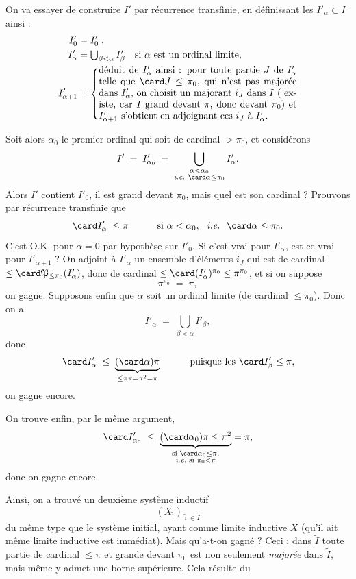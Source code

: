 %

On va essayer de construire $I'$ par récurrence transfinie, en définissant les $I'_\alpha\subset I$ ainsi :
\[
\begin{aligned}
I'_0 &= I'_0\;, \\
I'_\alpha &= \textstyle\bigcup_{\beta<\alpha} I'_\beta \quad \text{si $\alpha$ est un ordinal limite,} \\
I'_{\alpha+1} &= \left\{\parbox{0.6\textwidth}{déduit de $I'_\alpha$ ainsi : pour toute partie $J$ de $I'_\alpha$ telle que $\card J\le\pi_0$, qui n'est pas majorée dans $I'_\alpha$, on choisit un majorant $i_J$ dans $I$ ( existe, car $I$ grand devant $\pi$, donc devant $\pi_0$) et $I'_{\alpha+1}$ s'obtient en adjoignant ces $i_J$ à $I'_\alpha$.}\right.
\end{aligned}
\]

Soit alors $\alpha_0$ le premier ordinal qui soit de cardinal $>\pi_0$, et considérons
\[
I' \;=\; I'_{\alpha_0} \;=\; \bigcup\limits_{\substack{\alpha<\alpha_0\\ \textit{i.e.}\ \card\alpha\le\pi_0}} I'_\alpha .
\]
Alors $I'$ contient $I'_0$, il est grand devant $\pi_0$, mais quel est son cardinal ? Prouvons par récurrence transfinie que
\[
\card I'_\alpha \;\le\pi \qquad\quad \text{si } \alpha<\alpha_0,\ \ \textit{i.e.}\ \ \card\alpha\le\pi_0 .
\]
C'est O.K. pour $\alpha=0$ par hypothèse sur $I'_0$. Si c'est vrai pour $I'_\alpha$, est-ce vrai pour $I'_{\alpha+1}$ ? On adjoint à $I'_\alpha$ un ensemble d'éléments $i_J$ qui est de cardinal $\le\card\mathfrak{P}_{\le\pi_0}(I'_\alpha)$, donc de cardinal $\le\card(I'_\alpha)^{\pi_0}\le\pi^{\pi_0}$, et si on suppose
\[
\pi^{\pi_0} \;=\; \pi,
\]
on gagne. Supposons enfin que $\alpha$ soit un ordinal limite (de cardinal $\le\pi_0$). Donc on a
\[
I'_\alpha \;=\; \bigcup_{\beta<\alpha} I'_\beta ,
\]
donc
\[
\card I'_\alpha \;\le\; \underbrace{(\card\alpha)\pi}_{\le\pi\pi=\pi^2=\pi} \qquad\quad \text{puisque les } \card I'_\beta\le\pi,
\]
on gagne encore.

On trouve enfin, par le même argument,
\[
\card I'_{\alpha_0} \;\le\; \underbrace{(\card\alpha_0)\pi\le\pi^2}_{\substack{\text{si }\card\alpha_0\le\pi,\\ \textit{i.e.}\text{ si }\pi_0<\pi}} = \pi,
\]
donc on gagne encore.

Ainsi, on a trouvé un deuxième système inductif
\[
(X_{\tilde\imath})_{\tilde\imath\in\tilde I}
\]
du même type que le système initial, ayant comme limite inductive $X$ (qu'il ait même limite inductive est immédiat). Mais qu'a-t-on gagné ? Ceci : dans $\tilde I$ toute partie de cardinal $\le\pi$ et grande devant $\pi_0$ est non seulement \textit{majorée} dans $\tilde I$, mais même y admet une borne supérieure. Cela résulte du %

